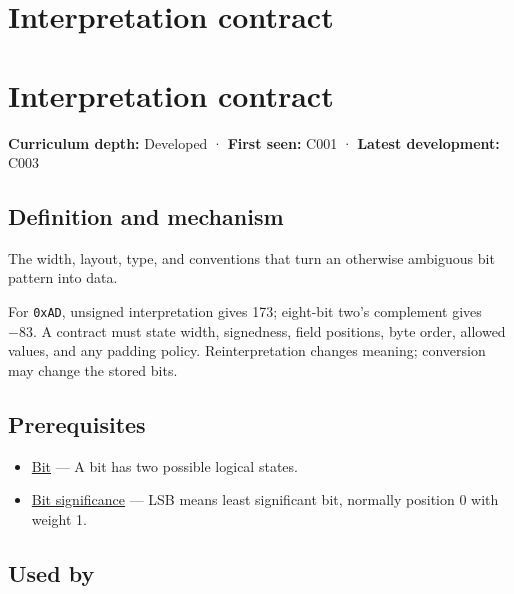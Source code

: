 \hypertarget{appendix-f414bd4ed05c}{}
\section*{Interpretation contract}
\section{Interpretation contract}\label{appendix-f414bd4ed05c-interpretation-contract}

\textbf{Curriculum depth:} Developed · \textbf{First seen:} C001 · \textbf{Latest development:} C003

\subsection{Definition and mechanism}\label{appendix-f414bd4ed05c-definition-and-mechanism}

The width, layout, type, and conventions that turn an otherwise ambiguous bit pattern into data.

For \texttt{0xAD}, unsigned interpretation gives 173; eight-bit two's complement gives −83. A contract must state width, signedness, field positions, byte order, allowed values, and any padding policy. Reinterpretation changes meaning; conversion may change the stored bits.

\subsection{Prerequisites}\label{appendix-f414bd4ed05c-prerequisites}

\begin{itemize}
\tightlist
\item
  \hyperref[appendix-ddbb69998a2e]{Bit} --- A bit has two possible logical states.
\item
  \hyperref[appendix-280445746493]{Bit significance} --- LSB means least significant bit, normally position 0 with weight 1.
\end{itemize}

\subsection{Used by}\label{appendix-f414bd4ed05c-used-by}

